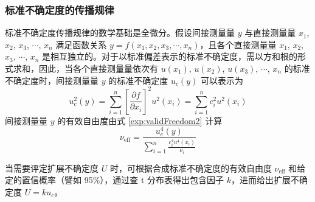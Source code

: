     \subsubsection{标准不确定度的传播规律}
    标准不确定度传播规律的数学基础是全微分。假设间接测量量 $y$ 与直接测量量 $x_1$, $x_2$, $x_3$, $\cdots$, $x_n$ 满足函数关系 $y = f(x_1,x_2,x_3,\cdots,x_n)$，且各个直接测量量 $x_1$, $x_2$, $x_3$, $\cdots$, $x_n$ 是相互独立的。对于以标准偏差表示的标准不确定度，需以方和根的形式求和，因此，当各个直接测量量依次有 $u(x_1)$, $u(x_2)$, $u(x_3)$, $\cdots$, $x_n$ 的标准不确定度时，间接测量量 $y$ 的标准不确定度 $u_c(y)$ 可以表示为
    \begin{equation}
        u_c^2(y)=\sum_{i=1}^{n}\left[\frac{\partial f}{\partial x_i}\right]^{2}u^2\left(x_{i}\right)=\sum_{i=1}^{n}c_i^2 u^2\left(x_{i}\right) \label{exp:uncertaintyPropagation}
    \end{equation}
    间接测量量 $y$ 的有效自由度由式 \ref{exp:validFreedom2} 计算
    \begin{equation}
        \nu_\text{eff}=\frac{u_c^4(y)}{\displaystyle\sum_{i=1}^{n}\frac{c_i^4 u^4(x_i)}{\nu_i}} \label{exp:validFreedom2}
    \end{equation}

    当需要评定扩展不确定度 $U$ 时，可根据合成标准不确定度的有效自由度 $\nu_\text{eff}$ 和给定的置信概率（譬如 95\%），通过查 t 分布表得出包含因子 $k$，进而给出扩展不确定度 $U = k u_c$。
